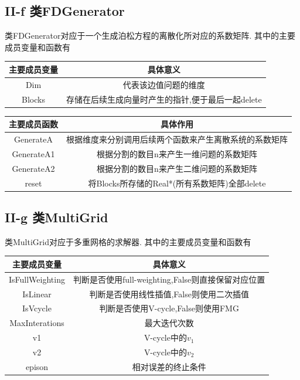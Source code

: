 \documentclass[twoside,a4paper]{article}
\begin{document}
\subsection*{II-f 类FDGenerator}
类FDGenerator对应于一个生成泊松方程的离散化所对应的系数矩阵.
其中的主要成员变量和函数有
\begin{center}
    \begin{tabular}{c|c}
        主要成员变量 & 具体意义                                          \\
        \hline
        Dim          & 代表该边值问题的维度                              \\
        Blocks       & 存储在后续生成向量时产生的指针,便于最后一起delete \\
    \end{tabular}
\end{center}

\begin{center}
    \begin{tabular}{c|c}
        主要成员函数 & 具体作用                                               \\
        \hline
        GenerateA    & 根据维度来分别调用后续两个函数来产生离散系统的系数矩阵 \\
        GenerateA1   & 根据分割的数目n来产生一维问题的系数矩阵                \\
        GenerateA2   & 根据分割的数目n来产生二维问题的系数矩阵                \\
        reset        & 将Blocks所存储的Real*(所有系数矩阵)全部delete          \\
    \end{tabular}
\end{center}

\subsection*{II-g 类MultiGrid}
类MultiGrid对应于多重网格的求解器.
其中的主要成员变量和函数有
\begin{center}
    \begin{tabular}{c|c}
        主要成员变量    & 具体意义                                           \\
        \hline
        IsFullWeighting & 判断是否使用full-weighting,False则直接保留对应位置 \\
        IsLinear        & 判断是否使用线性插值,False则使用二次插值           \\
        IsVcycle        & 判断是否使用V-cycle,False则使用FMG                 \\
        MaxInterations  & 最大迭代次数                                       \\
        v1              & V-cycle中的$v_1$                                   \\
        v2              & V-cycle中的$v_2 $                                  \\
        epison          & 相对误差的终止条件                                 \\
    \end{tabular}
\end{center}
\end{document}
